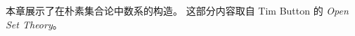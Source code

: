 \documentclass[../../../include/open-logic-section]{subfiles}
\begin{document}

\begin{editorial}
本章展示了在朴素集合论中数系的构造。
这部分内容取自 Tim Button 的 \emph{Open Set Theory}。
\end{editorial}


\OLEndChapterHook
\end{document}
